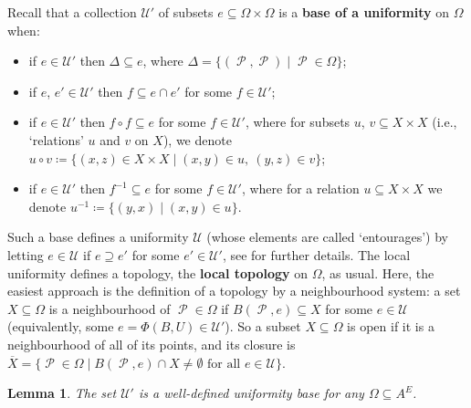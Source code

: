 \documentclass[11pt]{amsart}
\numberwithin{equation}{section}
\theoremstyle{plain}
\newtheorem{lemma}[theorem]{Lemma}
\theoremstyle{definition}
\DeclareMathOperator{\cP}{\mathcal{P}}
\begin{document}
Recall that a collection \(\mathscr{U}'\) of subsets \(e \subseteq \Omega \times \Omega\) is a \textbf{base of a uniformity} on \(\Omega\) when:
\begin{itemize}
	\item[(a)] if \(e \in \mathscr{U}'\) then \(\Delta \subseteq e\), where \(\Delta = \{(\cP,\cP) \mid \cP \in \Omega\}\);
	\item[(b)] if \(e\), \(e' \in \mathscr{U}'\) then \(f \subseteq e \cap e'\) for some \(f \in \mathscr{U}'\);
	\item[(c)] if \(e \in \mathscr{U}'\) then \(f \circ f \subseteq e\) for some \(f \in \mathscr{U}'\), where for subsets \(u\), \(v \subseteq X \times X\) (i.e., `relations' \(u\) and \(v\) on \(X\)), we denote \(u \circ v \coloneqq \{(x,z) \in X \times X \mid (x,y) \in u, \ (y,z) \in v\}\);
	\item[(d)] if \(e \in \mathscr{U}'\) then \(f^{-1} \subseteq e\) for some \(f \in \mathscr{U}'\), where for a relation \(u \subseteq X \times X\) we denote \(u^{-1} \coloneqq \{(y,x) \mid (x,y) \in u\}\).
\end{itemize}
Such a base defines a uniformity \(\mathscr{U}\) (whose elements are called `entourages') by letting \(e \in \mathscr{U}\) if \(e \supseteq e'\) for some \(e' \in \mathscr{U}'\), see \cite[Definition 35.2]{Wil04} for further details. The local uniformity defines a topology, the \textbf{local topology} on \(\Omega\), as usual. Here, the easiest approach is the definition of a topology by a neighbourhood system: a set \(X \subseteq \Omega\) is a neighbourhood of \(\cP \in \Omega\) if \(B(\cP,e) \subseteq X\) for some \(e \in \mathscr{U}\) (equivalently, some \(e = \Phi(B,U) \in \mathscr{U}'\)). So a subset \(X \subseteq \Omega\) is open if it is a neighbourhood of all of its points, and its closure is \(\overline{X} = \{\cP \in \Omega \mid B(\cP,e) \cap X \neq \emptyset \text{ for all }e \in \mathscr{U}\}\).

\begin{lemma}\label{lem:uniformity well-defined}
The set \(\mathscr{U}'\) is a well-defined uniformity base for any \(\Omega \subseteq A^E\).
\end{lemma}
\end{document}
